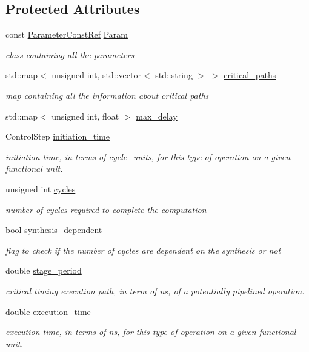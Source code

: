\subsection*{Protected Attributes}
\begin{DoxyCompactItemize}
\item 
const \hyperlink{Parameter_8hpp_a37841774a6fcb479b597fdf8955eb4ea}{Parameter\+Const\+Ref} \hyperlink{classtime__model_adfd18786156118b7467cef8117933674}{Param}
\begin{DoxyCompactList}\small\item\em class containing all the parameters \end{DoxyCompactList}\item 
std\+::map$<$ unsigned int, std\+::vector$<$ std\+::string $>$ $>$ \hyperlink{classtime__model_afdf3b59507831e6cfe76e88cc3195b0f}{critical\+\_\+paths}
\begin{DoxyCompactList}\small\item\em map containing all the information about critical paths \end{DoxyCompactList}\item 
std\+::map$<$ unsigned int, float $>$ \hyperlink{classtime__model_a777fafc4e47a09494a73ce6ac0927a32}{max\+\_\+delay}
\item 
Control\+Step \hyperlink{classtime__model_a2bee5d1ff834d4b990970a48971c31a2}{initiation\+\_\+time}
\begin{DoxyCompactList}\small\item\em initiation time, in terms of cycle\+\_\+units, for this type of operation on a given functional unit. \end{DoxyCompactList}\item 
unsigned int \hyperlink{classtime__model_a0589dea91b7289451931e24629a4ba66}{cycles}
\begin{DoxyCompactList}\small\item\em number of cycles required to complete the computation \end{DoxyCompactList}\item 
bool \hyperlink{classtime__model_ac3c675ab429d2fa91774c0f8184d0a8f}{synthesis\+\_\+dependent}
\begin{DoxyCompactList}\small\item\em flag to check if the number of cycles are dependent on the synthesis or not \end{DoxyCompactList}\item 
double \hyperlink{classtime__model_ab7abe2f50afbad1e50d48f2763486615}{stage\+\_\+period}
\begin{DoxyCompactList}\small\item\em critical timing execution path, in term of ns, of a potentially pipelined operation. \end{DoxyCompactList}\item 
double \hyperlink{classtime__model_a7b02cefe3b48c07b9bf06e70e1333afa}{execution\+\_\+time}
\begin{DoxyCompactList}\small\item\em execution time, in terms of ns, for this type of operation on a given functional unit. \end{DoxyCompactList}\end{DoxyCompactItemize}


